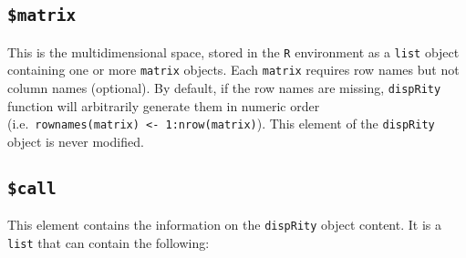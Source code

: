 \documentclass[
]{book}
\begin{document}
\hypertarget{matrix}{%
\subsection{\texorpdfstring{\texttt{\$matrix}}{\$matrix}}\label{matrix}}

This is the multidimensional space, stored in the \texttt{R} environment as a \texttt{list} object containing one or more \texttt{matrix} objects.
Each \texttt{matrix} requires row names but not column names (optional).
By default, if the row names are missing, \texttt{dispRity} function will arbitrarily generate them in numeric order (i.e.~\texttt{rownames(matrix)\ \textless{}-\ 1:nrow(matrix)}).
This element of the \texttt{dispRity} object is never modified.

\hypertarget{call}{%
\subsection{\texorpdfstring{\texttt{\$call}}{\$call}}\label{call}}

This element contains the information on the \texttt{dispRity} object content.
It is a \texttt{list} that can contain the following:
\end{document}
